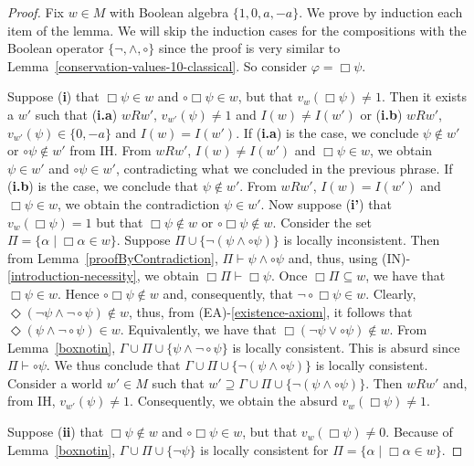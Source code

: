\documentclass{amsart}
\begin{document}
\begin{proof} Fix $w \in M$ with Boolean algebra $\{1,0,a,-a\}$. We prove by induction each item of the lemma. We will skip the induction cases for the compositions with the Boolean operator $\{\lnot, \land, \circ\}$ since the proof is very similar to Lemma~\ref{conservation-values-10-classical}. So consider $\varphi = \Box \psi$. 
    
    Suppose (\textbf{i}) that $\Box \psi \in w$ and $\circ \Box \psi \in w$, but that $v_w(\Box \psi) \neq 1$. 
    Then it exists a $w'$ such that (\textbf{i.a}) $w R w'$, $v_{w'}(\psi) \neq 1$ and $I(w) \neq I(w')$ or (\textbf{i.b}) $w R w'$, $v_{w'}(\psi) \in \{0, -a\}$ and $I(w) = I(w')$. 
    If (\textbf{i.a}) is the case, we conclude $\psi \notin w'$ or $\circ \psi \notin w'$ from IH. From $w R w'$, $I(w) \neq I(w')$ and $\Box \psi \in w$, we obtain $\psi \in w'$ and $\circ \psi \in w'$, contradicting what we concluded in the previous phrase. If (\textbf{i.b}) is the case, we conclude that $\psi \notin w'$. From $w R w'$, $I(w) = I(w')$ and $\Box \psi \in w$, we obtain the contradiction $\psi \in w'$. Now suppose (\textbf{i'}) that $v_w(\Box \psi) = 1$ but that $\Box \psi \notin w$ or $\circ \Box \psi \notin w$. Consider the set $\Pi = \{\alpha \mid \Box \alpha \in w\}$.  
    Suppose $\Pi \cup \{\lnot (\psi \land \circ \psi)\}$ is locally inconsistent. Then from Lemma~\ref{proofByContradiction}, $\Pi \vdash \psi \land \circ \psi$ and, thus, using (IN)-\ref{introduction-necessity}, we obtain $\Box \Pi \vdash \Box \psi$. Once $\Box \Pi \subseteq w$, we have that $\Box \psi \in w$. Hence $\circ \Box \psi \notin w$ and, consequently, that $\lnot \circ \Box \psi \in w$. Clearly, $\Diamond (\neg \psi \land \lnot \circ \psi) \notin w$, thus, from (EA)-\ref{existence-axiom}, it follows that $\Diamond (\psi \land \lnot \circ \psi) \in w$. Equivalently, we have that $\Box (\lnot \psi \lor \circ \psi) \notin w$. From Lemma~\ref{boxnotin}, $\Gamma \cup\Pi \cup \{\psi \land \lnot \circ \psi\}$ is locally consistent. This is absurd since $\Pi \vdash \circ \psi$. We thus conclude that $\Gamma \cup\Pi \cup \{\lnot (\psi \land \circ \psi)\}$ is locally consistent. Consider a world $w' \in M$ such that $w' \supseteq \Gamma \cup\Pi \cup \{\lnot (\psi \land \circ \psi)\}$. Then $w R w'$ and, from IH, $v_{w'}(\psi) \neq 1$. Consequently, we obtain the absurd $v_w(\Box \psi) \neq 1$.

    Suppose (\textbf{ii}) that $\Box \psi \notin w$ and $\circ \Box \psi \in w$, but that $v_w(\Box \psi) \neq 0$. Because of Lemma~\ref{boxnotin}, $\Gamma \cup\Pi \cup \{\lnot \psi\}$ is locally consistent for $\Pi = \{\alpha \mid \Box \alpha \in w\}$. 
    

\end{proof}
\end{document}
